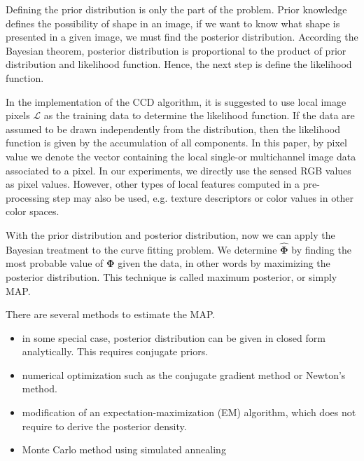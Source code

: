 
Defining the prior distribution is only the part of the problem. Prior knowledge
defines the possibility of shape in an image, if we want to know what
shape is presented in a given image, we must find the posterior
distribution. According the Bayesian theorem, posterior distribution
is proportional to the product of prior distribution and likelihood
function. Hence, the next step is define the likelihood function.

In the implementation of the CCD algorithm, it is suggested to use local image pixels $\mathcal{L}$ as the training data to
determine the likelihood function. If the data are assumed to be drawn
 independently from the distribution, then the likelihood function is
given by the accumulation of all components.
In this paper, by pixel value we denote the vector containing the local single-or multichannel
image data associated to a pixel. In our experiments, we directly use the sensed RGB
values as pixel values. However, other types of local features computed in a pre-processing
step may also be used, e.g. texture descriptors or color values in
other color spaces.

With the prior distribution and posterior distribution, now we can
apply the Bayesian treatment to the curve fitting problem.
We determine $\hat{\mathbf{\Phi}}$ by finding the most probable
value of $\mathbf{\Phi}$ given the data, in other words by maximizing
the posterior distribution. This technique is called maximum
posterior, or simply MAP.

There are several methods to estimate the MAP.
\begin{itemize}
\item in some special case, posterior distribution can be given in
  closed form analytically. This requires conjugate priors.
\item numerical optimization such as the conjugate gradient method or
  Newton's method.
\item modification of an expectation-maximization (EM) algorithm,
  which does not require to derive the posterior density.
\item Monte Carlo method using simulated annealing
\end{itemize}

